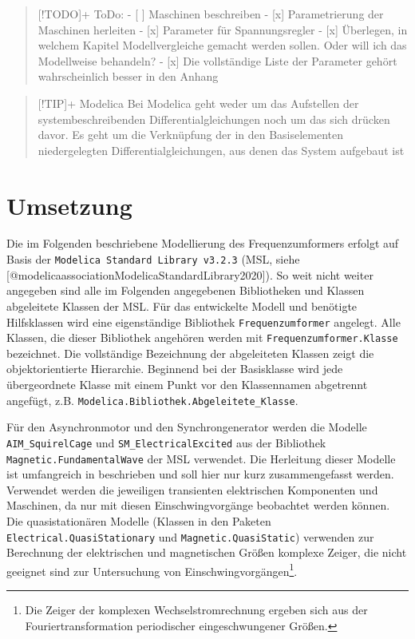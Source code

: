 \begin{quote}
{[}!TODO{]}+ ToDo: - {[} {]} Maschinen beschreiben - {[}x{]}
Parametrierung der Maschinen herleiten - {[}x{]} Parameter für
Spannungsregler - {[}x{]} Überlegen, in welchem Kapitel Modellvergleiche
gemacht werden sollen. Oder will ich das Modellweise behandeln? -
{[}x{]} Die vollständige Liste der Parameter gehört wahrscheinlich
besser in den Anhang
\end{quote}

\begin{quote}
{[}!TIP{]}+ Modelica Bei Modelica geht weder um das Aufstellen der
systembeschreibenden Differentialgleichungen noch um das sich drücken
davor. Es geht um die Verknüpfung der in den Basiselementen
niedergelegten Differentialgleichungen, aus denen das System aufgebaut
ist
\end{quote}

\hypertarget{umsetzung}{%
\section{Umsetzung}\label{umsetzung}}

Die im Folgenden beschriebene Modellierung des Frequenzumformers erfolgt
auf Basis der \texttt{Modelica\ Standard\ Library\ v3.2.3} (MSL, siehe
{[}@modelicaassociationModelicaStandardLibrary2020{]}). So weit nicht
weiter angegeben sind alle im Folgenden angegebenen Bibliotheken und
Klassen abgeleitete Klassen der MSL. Für das entwickelte Modell und
benötigte Hilfsklassen wird eine eigenständige Bibliothek
\texttt{Frequenzumformer} angelegt. Alle Klassen, die dieser Bibliothek
angehören werden mit \texttt{Frequenzumformer.Klasse} bezeichnet. Die
vollständige Bezeichnung der abgeleiteten Klassen zeigt die
objektorientierte Hierarchie. Beginnend bei der Basisklasse wird jede
übergeordnete Klasse mit einem Punkt vor den Klassennamen abgetrennt
angefügt, z.B. \texttt{Modelica.Bibliothek.Abgeleitete\_Klasse}.

Für den Asynchronmotor und den Synchrongenerator werden die Modelle
\texttt{AIM\_SquirelCage} und \texttt{SM\_ElectricalExcited} aus der
Bibliothek \texttt{Magnetic.FundamentalWave} der MSL verwendet. Die
Herleitung dieser Modelle ist umfangreich in
\cite[]{kralModelicaObjektorientierteModellbildung2019} beschrieben und
soll hier nur kurz zusammengefasst werden. Verwendet werden die
jeweiligen transienten elektrischen Komponenten und Maschinen, da nur
mit diesen Einschwingvorgänge beobachtet werden können. Die
quasistationären Modelle (Klassen in den Paketen
\texttt{Electrical.QuasiStationary} und \texttt{Magnetic.QuasiStatic})
verwenden zur Berechnung der elektrischen und magnetischen Größen
komplexe Zeiger, die nicht geeignet sind zur Untersuchung von
Einschwingvorgängen\footnote{Die Zeiger der komplexen
  Wechselstromrechnung ergeben sich aus der Fouriertransformation
  periodischer eingeschwungener Größen.}.

